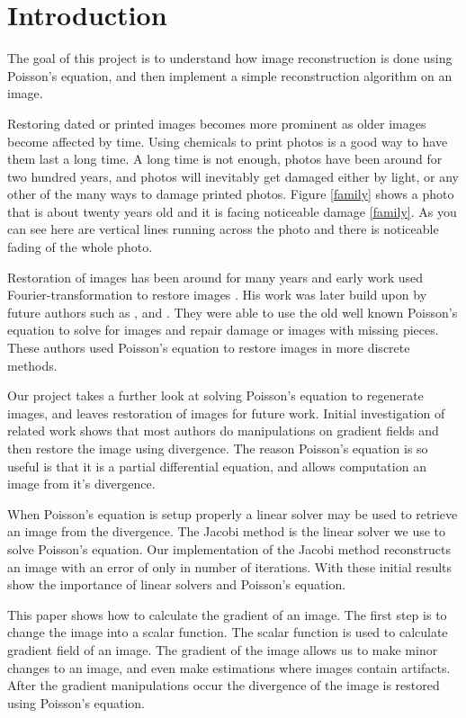 \documentclass[10pt,twopage]{acmsiggraph}
\begin{document}
\section{Introduction}
\label{Intro}
 

The goal of this project is to understand how image reconstruction is done using Poisson's equation, and then implement a simple reconstruction algorithm on an image.

Restoring dated or printed images becomes more prominent as older images become affected by time. Using chemicals to print photos is a good way to have them last a long time. A long time is not enough, photos have been around for two hundred years, and photos will inevitably get damaged either by light, or any other of the many ways to damage printed photos. Figure \ref{family} shows a photo that is about twenty years old and it is facing noticeable damage \ref{family}. As you can see here are vertical lines running across the photo and there is noticeable fading of the whole photo. 

Restoration of images has been around for many years and early work used Fourier-transformation to restore images \cite{richardson72}. His work was later build upon by future authors such as \cite{Bertalmio}, and \cite{Perez}. They were able to use the old well known Poisson's equation to solve for images and repair damage or images with missing pieces. These authors used Poisson's equation to restore images in more discrete methods.

Our project takes a further look at solving Poisson's equation to regenerate images, and leaves restoration of images for future work. Initial investigation of related work shows that most authors do manipulations on gradient fields and then restore the image using  divergence.  The reason Poisson's equation is so useful is that it is a partial differential equation, and allows computation an image from it's divergence. 

When Poisson's equation is setup properly a linear solver may be used to retrieve an image from the divergence. The Jacobi method is the linear solver we use to solve Poisson's equation. Our implementation of the Jacobi method reconstructs an image with an error of only \result in \iteration number of iterations. With these initial results show the importance of linear solvers and Poisson's equation.

This paper shows how to calculate the gradient of an image. The first step is to change the image into a scalar function. The scalar function is used to calculate gradient field of an image. The gradient of the image allows us to make minor changes to an image, and even make estimations where images contain artifacts. After the gradient manipulations occur the divergence of the image is restored using Poisson's equation. 
\end{document}
